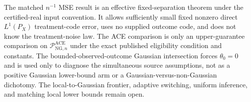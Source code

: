 The matched \(n^{-1}\) MSE result is an effective fixed-separation theorem under the certified-real input convention.  It allows sufficiently small fixed nonzero direct \(L^1(P_X)\) treatment-code error, uses no supplied outcome code, and does not know the treatment-noise law.  The ACE comparison is only an upper-guarantee comparison on \(\mathcal P_{\mathrm{NG},n}^{\mathrm{ACE}}\) under the exact published eligibility condition and constants.  The bounded-observed-outcome Gaussian intersection forces \(\theta_0=0\) and is used only to diagnose the simultaneous source assumptions, not as a positive Gaussian lower-bound arm or a Gaussian-versus-non-Gaussian dichotomy.  The local-to-Gaussian frontier, adaptive switching, uniform inference, and matching local lower bounds remain open.